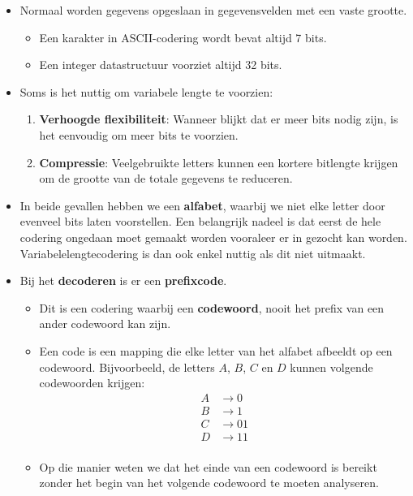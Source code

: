 \begin{itemize}
    \item Normaal worden gegevens opgeslaan  in gegevensvelden met een vaste grootte.
    \begin{itemize}
        \item Een karakter in ASCII-codering wordt bevat altijd 7 bits.
        \item Een integer datastructuur voorziet altijd 32 bits.
    \end{itemize}
    \item Soms is het nuttig om variabele lengte te voorzien:
    \begin{enumerate}
        \item \textbf{Verhoogde flexibiliteit}: Wanneer blijkt dat er meer bits nodig zijn, is het eenvoudig om meer bits te voorzien. 
        \item \textbf{Compressie}: Veelgebruikte letters kunnen een kortere bitlengte krijgen om de grootte van de totale gegevens te reduceren.
    \end{enumerate}
    \item In beide gevallen hebben we een \textbf{alfabet}, waarbij we niet elke letter door evenveel bits laten voorstellen.
    \alert Een belangrijk nadeel is dat eerst de hele codering ongedaan moet gemaakt worden vooraleer er in gezocht kan worden. Variabelelengtecodering is dan ook enkel nuttig als dit niet uitmaakt.
    \item Bij het \textbf{decoderen} is er een \textbf{prefixcode}. 
    \begin{itemize}
        \item Dit is een codering waarbij een \textbf{codewoord}, nooit het prefix van een ander codewoord kan zijn.
        \item Een code is een mapping die elke letter van het alfabet afbeeldt op een codewoord. Bijvoorbeeld, de letters $A$, $B$, $C$ en $D$ kunnen volgende codewoorden krijgen:
        \begin{align*}
            A &\rightarrow 0 \\
            B &\rightarrow 1 \\
            C &\rightarrow 01 \\
            D &\rightarrow 11 \\
        \end{align*}
        \item Op die manier weten we dat het einde van een codewoord is bereikt zonder het begin van het volgende codewoord te moeten analyseren.

\end{itemize}
\end{itemize}
